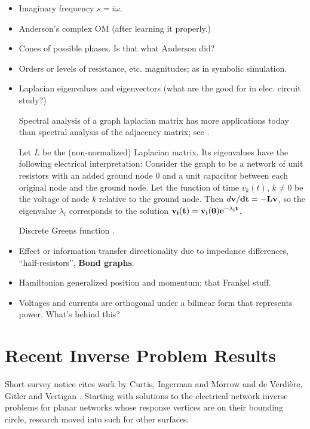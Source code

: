 \documentclass{article}
\begin{document}
\begin{itemize}
\item Imaginary frequency $s=i\omega$.
\item Anderson's complex OM (after learning it properly.)
\item Cones of possible phases.  Is that what Anderson did?
\item Orders or levels of resistance, etc. magnitudes; as
in symbolic simulation.
\item Laplacian eigenvalues and eigenvectors  (what are the good for in elec. circuit
study?) 

Spectral analysis of a graph laplacian matrix has more applications today than
spectral analysis of the adjacency matrix; see \cite{ChungSpectralGraphTheory}.

Let $L$ be the (non-normalized) Laplacian matrix.  Its eigenvalues have the 
following electrical interpretation:  
Consider the graph to be a network of unit resistors with an added ground 
node $0$ and a unit capacitor between each original node and the ground node.  
Let the function of time $v_k(t)$, $k\neq 0$ be the voltage of node $k$ 
relative to 
the ground node.  Then $d\bf{v}/dt = -L\bf{v}$, so the eigenvalue $\lambda_i$
corresponds to the solution $\bf{v}_i(t) = \bf{v}_i(0)e^{-\lambda_i t}$.

Discrete Greens function \cite{ChungYaoDiscreteGreensFn}.

\item Effect or information transfer directionality due to impedance
differences, ``half-resistors'',  \textbf{Bond graphs}.
\item Hamiltonian generalized position and momentum; that Frankel stuff.
\item Voltages and currents are orthogonal under a bilinear form that 
represents power.  What's behind this?
\end{itemize}


\section{Recent Inverse Problem Results}



Short survey notice \cite{LamAMSNotice} cites
work by Curtis, Ingerman and Morrow \cite{CurtisIngermanMorrowCircPlanarRes}
and de Verdi{\`e}re, Gitler and Vertigan \cite{VertdiereGitlerVertigan}.
Starting with solutions to the electrical network inverse problems for planar
networks whose response vertices are on their bounding circle, research moved
into such for other surfaces.
\end{document}
